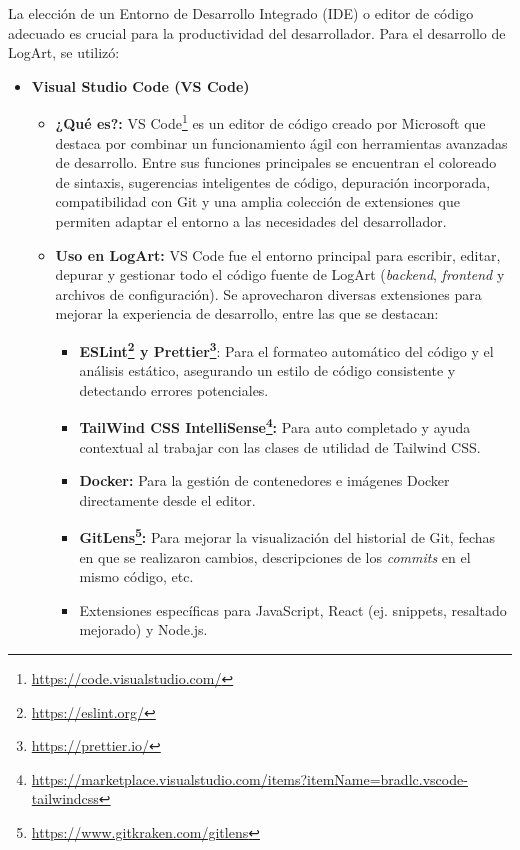 La elección de un Entorno de Desarrollo Integrado (IDE) o editor de código adecuado es crucial para la productividad del desarrollador. Para el desarrollo de LogArt, se utilizó:
    \begin{itemize}
        \item \textbf{Visual Studio Code (VS Code)}
            \begin{itemize}
                \item \textbf{¿Qué es?:} VS Code\footnote{\url{https://code.visualstudio.com/}} es un editor de código creado por Microsoft que destaca por combinar un funcionamiento ágil con herramientas avanzadas de desarrollo. Entre sus funciones principales se encuentran el coloreado de sintaxis, sugerencias inteligentes de código, depuración incorporada, compatibilidad con Git y una amplia colección de extensiones que permiten adaptar el entorno a las necesidades del desarrollador.
                \item \textbf{Uso en LogArt:} VS Code fue el entorno principal para escribir, editar, depurar y gestionar todo el código fuente de LogArt (\textit{backend}, \textit{frontend} y archivos de configuración). Se aprovecharon diversas extensiones para mejorar la experiencia de desarrollo, entre las que se destacan:
                    \begin{itemize}
                        \item \textbf{ESLint\footnote{\url{https://eslint.org/}} y Prettier\footnote{\url{https://prettier.io/}}}: Para el formateo automático del código y el análisis estático, asegurando un estilo de código consistente y detectando errores potenciales.
                        \item \textbf{TailWind CSS IntelliSense\footnote{\url{https://marketplace.visualstudio.com/items?itemName=bradlc.vscode-tailwindcss}}:} Para auto completado y ayuda contextual al trabajar con las clases de utilidad de Tailwind CSS.
                        \item \textbf{Docker:} Para la gestión de contenedores e imágenes Docker directamente desde el editor.
                        \item \textbf{GitLens\footnote{\url{https://www.gitkraken.com/gitlens}}:} Para mejorar la visualización del historial de Git, fechas en que se realizaron cambios, descripciones de los \textit{commits} en el mismo código, etc.
                        \item Extensiones específicas para JavaScript, React (ej. snippets, resaltado mejorado) y Node.js.
                    \end{itemize}
            \end{itemize}
    \end{itemize}

